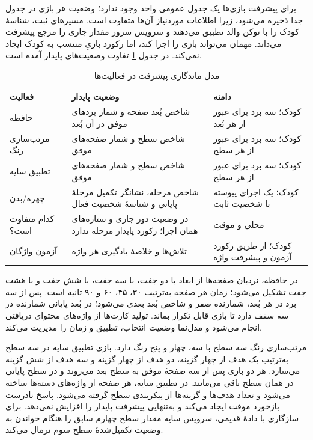 برای پیشرفت بازی‌ها یک جدول عمومی واحد وجود ندارد؛ وضعیت هر بازی در جدول جدا ذخیره می‌شود، زیرا اطلاعات موردنیاز آن‌ها متفاوت است. مسیرهای ثبت، شناسهٔ کودک را با توکن والد تطبیق می‌دهند و سرویس سرور مقدار جاری را مرجع پیشرفت می‌داند. مهمان می‌تواند بازی را اجرا کند، اما رکورد بازیِ منتسب به کودک ایجاد نمی‌کند. در جدول \ref{Tab:GameProgress} تفاوت وضعیت‌های پایدار آمده است.

\begin{table}[ht]
\centering
\caption{مدل ماندگاری پیشرفت در فعالیت‌ها}
\label{Tab:GameProgress}
\begin{tabular}{|p{}|p{}|p{}|}
\hline
\textbf{فعالیت} & \textbf{وضعیت پایدار} & \textbf{دامنه} \\
\hline
حافظه & شاخص بُعد صفحه و شمار بردهای موفق در آن بُعد & کودک؛ سه برد برای عبور از هر بُعد \\
\hline
مرتب‌سازی رنگ & شاخص سطح و شمار صفحه‌های موفق & کودک؛ سه برد برای عبور از هر سطح \\
\hline
تطبیق سایه & شاخص سطح و شمار صفحه‌های موفق & کودک؛ سه برد برای عبور از هر سطح \\
\hline
چهره/بدن & شاخص مرحله، نشانگر تکمیل مرحلهٔ پایانی و شناسهٔ شخصیت فعال & کودک؛ یک اجرای پیوسته با شخصیت ثابت \\
\hline
کدام متفاوت است؟ & در وضعیت دور جاری و ستاره‌های همان اجرا؛ رکورد پایدار مرحله ندارد & محلی و موقت \\
\hline
آزمون واژگان & تلاش‌ها و خلاصهٔ یادگیری هر واژه & کودک؛ از طریق رکورد آزمون و پیشرفت واژه \\
\hline
\end{tabular}
\end{table}

در حافظه، نردبان صفحه‌ها از ابعاد  با دو جفت،  با سه جفت،  با شش جفت و  با هشت جفت تشکیل می‌شود؛ زمان هر صفحه به‌ترتیب ۳۰، ۴۵، ۶۰ و ۹۰ ثانیه است. پس از سه برد در هر بُعد، شمارنده صفر و شاخص بُعد بعدی می‌شود؛ در بُعد پایانی شمارنده در سه سقف دارد تا بازی قابل تکرار بماند. تولید کارت‌ها از واژه‌های محتوای دریافتی انجام می‌شود و مدل‌نما وضعیت انتخاب، تطبیق و زمان را مدیریت می‌کند.

مرتب‌سازی رنگ سه سطح با سه، چهار و پنج رنگ دارد. بازی تطبیق سایه در سه سطح به‌ترتیب یک هدف از چهار گزینه، دو هدف از چهار گزینه و سه هدف از شش گزینه می‌سازد. هر دو بازی پس از سه صفحهٔ موفق به سطح بعد می‌روند و در سطح پایانی در همان سطح باقی می‌مانند. در تطبیق سایه، هر صفحه از واژه‌های دسته‌ها ساخته می‌شود و تعداد هدف‌ها و گزینه‌ها از پیکربندی سطح گرفته می‌شود. پاسخ نادرست بازخورد موقت ایجاد می‌کند و به‌تنهایی پیشرفت پایدار را افزایش نمی‌دهد. برای سازگاری با دادهٔ قدیمی، سرویس سایه مقدار سطح چهارم سابق را هنگام خواندن به وضعیت تکمیل‌شدهٔ سطح سوم نرمال می‌کند.

